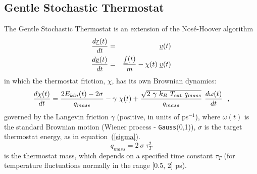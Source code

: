 \subsection{Gentle Stochastic Thermostat}

The Gentle Stochastic Thermostat \cite{leimkuhler-09a,samoletov-07a} is
an extension of the Nos\'e-Hoover algorithm \cite{hoover-85a}
\begin{eqnarray}
{d \mbox{$\underline{r}$}(t) \over d t} &=& \mbox{$\underline{v}$}(t) \nonumber \\
{d \mbox{$\underline{v}$}(t) \over d t} &=& {\mbox{$\underline{f}$}(t) \over m} - \chi (t) \; \mbox{$\underline{v}$}(t)
\end{eqnarray}
in which the thermostat friction, $\chi$, has its own Brownian dynamics:
\begin{equation}
{d \chi (t) \over dt} = \frac{2 E_{kin}(t) - 2 \sigma}{q_{mass}} - \gamma~\chi(t) +
\frac{\sqrt{2~\gamma~k_{B}~T_{\rm ext}~q_{mass}}}{q_{mass}}~{d \omega(t) \over d t}~~, \label{Ornstein-Uhlenbeck}
\end{equation}
governed by the Langevin friction $\gamma$ (positive, in units of ps$^{-1}$),
where $\omega(t)$ is the standard Brownian motion (Wiener process - {\tt Gauss}(0,1)),
$\sigma$ is the target thermostat energy, as in equation~(\ref{sigma}).
\begin{equation}
q_{mass} = 2~\sigma~\tau_{T}^{2}
\end{equation}
is the thermostat mass, which depends on a specified time constant
$\tau_{T}$ (for temperature fluctuations normally in the range [0.5,
2] ps).

